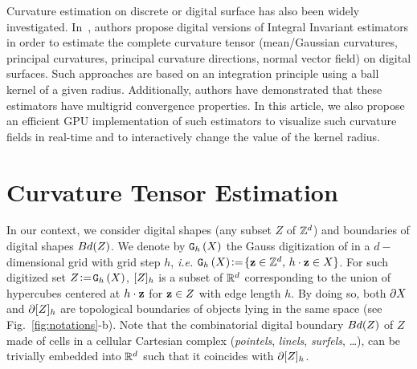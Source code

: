 \documentclass{llncs}
\begin{document}
Curvature estimation on discrete or digital surface has also been
widely investigated. In~\cite{CVIU2014}, authors propose digital
versions of Integral Invariant estimators
\cite{Pottmann2007,Pottmann2009} in order to estimate the complete
curvature tensor (mean/Gaussian curvatures, principal curvatures,
principal curvature directions, normal vector field) on digital
surfaces. Such approaches are based on an integration principle using
a ball kernel of a given radius. Additionally, authors have
demonstrated that these estimators have multigrid convergence
properties. In this article, we also propose an efficient GPU
implementation of such estimators to visualize
such curvature fields in real-time and
to interactively change the
value of the kernel radius.





\section{Curvature Tensor Estimation}
\label{sec:curv-tens-estim}

\sloppy In our context, we consider digital shapes (any subset $Z$ of ${\mathbb{Z}}^d$)
and boundaries of digital shapes $Bd(Z)$. We denote by $\mathtt{G}_{h}\left(X\right)$ the
Gauss digitization of  in a $d-$dimensional grid with grid step $h$,
\emph{i.e.}  $\mathtt{G}_{h}\left(X\right) \!\mathrel{\mathop:}=\! \{ \mathbf{z} \in {\mathbb{Z}}^d,\, h\cdot\mathbf{z}\in X\}$. For such
digitized set $Z\!\mathrel{\mathop:}=\!\mathtt{G}_{h}\left(X\right)$, $\lbrack Z \rbrack_{h}$ is a subset of ${\mathbb{R}}^d$
corresponding to the union of hypercubes centered at $h\cdot \mathbf{z}$ for $\mathbf{z}\in Z$
with edge length $h$. By doing so, both $\partial X$ and
$\partial\lbrack Z \rbrack_{h}$ are topological boundaries of objects lying in the same
space (see Fig.~\ref{fig:notations}-b). Note that the combinatorial digital
boundary $Bd(Z)$ of $Z$ made of cells in a cellular Cartesian complex
(\emph{pointels}, \emph{linels}, \emph{surfels}, \ldots), can be trivially
embedded into ${\mathbb{R}}^d$ such that it coincides with $\partial\lbrack Z \rbrack_{h}$.
\end{document}

